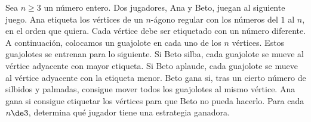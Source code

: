 Sea $n\ge 3$ un número entero. Dos jugadores, Ana y Beto, juegan al siguiente juego. Ana etiqueta los vértices de un $n$-ágono regular con los números del $1$ al $n$, en el orden que quiera. Cada vértice debe ser etiquetado con un número diferente. A continuación, colocamos un guajolote en cada uno de los $n$ vértices. 
Estos guajolotes se entrenan para lo siguiente. Si Beto silba, cada guajolote se mueve al vértice adyacente con mayor etiqueta. Si Beto aplaude, cada guajolote se mueve al vértice adyacente con la etiqueta menor. 
Beto gana si, tras un cierto número de silbidos y palmadas, consigue mover todos los guajolotes al mismo vértice. Ana gana si consigue etiquetar los vértices para que Beto no pueda hacerlo. Para cada $n\de 3$, determina qué jugador tiene una estrategia ganadora.

